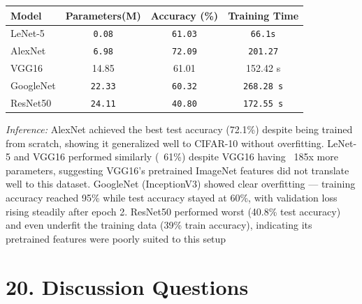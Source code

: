 \documentclass[11pt]{article}
\begin{document}
\begin{center}

\begin{tabular}{|l|c|c|c|}

\hline

Model &
Parameters(M) &
Accuracy (\%) &
Training Time\\

\hline

LeNet-5 & \texttt{0.08} & \texttt{61.03} & \texttt{66.1s}\\

\hline

AlexNet & \texttt{6.98} & \texttt{72.09} & \texttt{201.27}\\

\hline

VGG16 & 14.85 & 61.01 & 152.42 s\\

\hline

GoogleNet & \texttt{22.33} & \texttt{60.32} & \texttt{268.28 s}\\

\hline

ResNet50 & \texttt{24.11} & \texttt{40.80} & \texttt{172.55 s}\\

\hline

\end{tabular}

\end{center}

\emph{Inference: }
AlexNet achieved the best test accuracy (72.1\%) despite being trained from scratch, showing it generalized well to CIFAR-10 without overfitting. LeNet-5 and VGG16 performed similarly (~61\%) despite VGG16 having ~185x more parameters, suggesting VGG16's pretrained ImageNet features did not translate well to this dataset. GoogleNet (InceptionV3) showed clear overfitting — training accuracy reached 95\% while test accuracy stayed at 60\%, with validation loss rising steadily after epoch 2. ResNet50 performed worst (40.8\% test accuracy) and even underfit the training data (39\% train accuracy), indicating its pretrained features were poorly suited to this setup



\section*{20. Discussion Questions}
\end{document}
